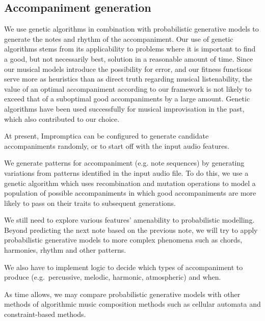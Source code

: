 \documentclass[11pt,conference,letterpaper]{IEEEtran}
\begin{document}
\subsection{Accompaniment generation}

We use genetic algorithms in combination with probabilistic generative models to generate the notes and rhythm of the accompaniment. Our use of genetic algorithms stems from its applicability to problems where it is important to find a good, but not necessarily best, solution in a reasonable amount of time. Since our musical models introduce the possibility for error, and our fitness functions serve more as heuristics than as direct truth regarding musical listenability, the value of an optimal accompaniment according to our framework is not likely to exceed that of a suboptimal good accompaniments by a large amount. Genetic algorithms have been used successfully for musical improvisation in the past, which also contributed to our choice.

At present, Impromptica can be configured to generate candidate accompaniments randomly, or to start off with the input audio features.



We generate patterns for accompaniment (e.g. note sequences) by generating variations from patterns identified in the input audio file. To do this, we use a genetic algorithm which uses recombination and mutation operations to model a population of possible accompaniments in which good accompaniments are more likely to pass on their traits to subsequent generations.

We still need to explore various features’ amenability to probabilistic modelling. Beyond predicting the next note based on the previous note, we will try to apply probabilistic generative models to more complex phenomena such as chords, harmonies, rhythm and other patterns.

We also have to implement logic to decide which types of accompaniment to produce (e.g.\ percussive, melodic, harmonic, atmospheric) and when.

As time allows, we may compare probabilistic generative models with other methods of algorithmic music composition methods such as cellular automata and constraint-based methods.
\end{document}
